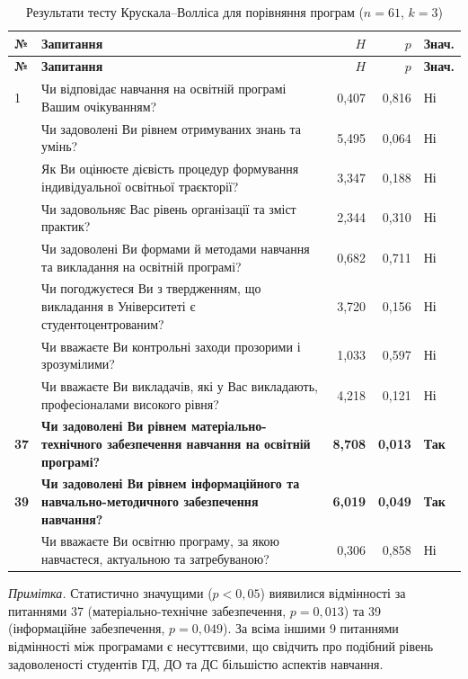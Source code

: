 \begin{longtable}{@{}p{}p{}rrp{}@{}}
\caption{Результати тесту Крускала--Волліса для порівняння програм ($n=61$, $k=3$)}\label{tab:app-kruskal} \\
\hline
\textbf{№} & \textbf{Запитання} & \textbf{$H$} & \textbf{$p$} & \textbf{Знач.} \\
\hline
\endfirsthead
\hline
\textbf{№} & \textbf{Запитання} & \textbf{$H$} & \textbf{$p$} & \textbf{Знач.} \\
\hline
\endhead
1 & Чи відповідає навчання на освітній програмі Вашим очікуванням? & 0,407 & 0,816 & Ні \\
\addlinespace
3 & Чи задоволені Ви рівнем отримуваних знань та умінь? & 5,495 & 0,064 & Ні \\
\addlinespace
7 & Як Ви оцінюєте дієвість процедур формування індивідуальної освітньої траєкторії? & 3,347 & 0,188 & Ні \\
\addlinespace
12 & Чи задовольняє Вас рівень організації та зміст практик? & 2,344 & 0,310 & Ні \\
\addlinespace
19 & Чи задоволені Ви формами й методами навчання та викладання на освітній програмі? & 0,682 & 0,711 & Ні \\
\addlinespace
20 & Чи погоджуєтеся Ви з твердженням, що викладання в Університеті є студентоцентрованим? & 3,720 & 0,156 & Ні \\
\addlinespace
28 & Чи вважаєте Ви контрольні заходи прозорими і зрозумілими? & 1,033 & 0,597 & Ні \\
\addlinespace
34 & Чи вважаєте Ви викладачів, які у Вас викладають, професіоналами високого рівня? & 4,218 & 0,121 & Ні \\
\addlinespace
\textbf{37} & \textbf{Чи задоволені Ви рівнем матеріально-технічного забезпечення навчання на освітній програмі?} & \textbf{8,708} & \textbf{0,013} & \textbf{Так} \\
\addlinespace
\textbf{39} & \textbf{Чи задоволені Ви рівнем інформаційного та навчально-методичного забезпечення навчання?} & \textbf{6,019} & \textbf{0,049} & \textbf{Так} \\
\addlinespace
49 & Чи вважаєте Ви освітню програму, за якою навчаєтеся, актуальною та затребуваною? & 0,306 & 0,858 & Ні \\
\hline
\end{longtable}

\textit{Примітка.} Статистично значущими ($p < 0{,}05$) виявилися відмінності за питаннями 37 (матеріально-технічне забезпечення, $p = 0{,}013$) та 39 (інформаційне забезпечення, $p = 0{,}049$). За всіма іншими 9 питаннями відмінності між програмами є несуттєвими, що свідчить про подібний рівень задоволеності студентів ГД, ДО та ДС більшістю аспектів навчання.

